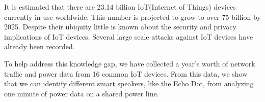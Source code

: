 It is estimated that there are 23.14 billion IoT(Internet of Things) devices currently in use worldwide. This number is projected to grow to over 75 billion by 2025. Despite their ubiquity little is known about the security and privacy implications of IoT devices. Several large scale attacks against IoT devices have already been recorded.

To help address this knowledge gap, we have collected a year’s worth of network traffic and power data from 16 common IoT devices. From this data, we show that we can identify different smart speakers, like the Echo Dot, from analyzing one minute of power data on a shared power line.